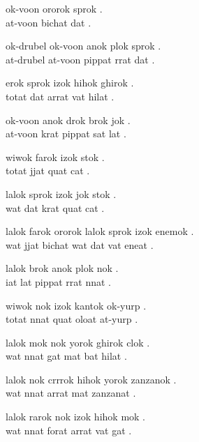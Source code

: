 \documentclass[a4paper, 11pt]{article}
\newlength{\lineseparation}
\begin{document}
\tt

 ok-voon ororok sprok . \\[\lineseparation]

 at-voon bichat dat .

\hrulefill

 ok-drubel ok-voon anok plok sprok . \\[\lineseparation]


 at-drubel at-voon pippat rrat dat . 

\hrulefill

 erok sprok izok hihok ghirok . \\[\lineseparation]


 totat dat arrat vat hilat . 

\hrulefill

 ok-voon anok drok brok jok . \\[\lineseparation]


 at-voon krat pippat sat lat . 

\hrulefill

 wiwok farok izok stok . \\[\lineseparation]


 totat jjat quat cat . 

\hrulefill

 lalok sprok izok jok stok . \\[\lineseparation]


 wat dat krat quat cat . 

\hrulefill

 lalok farok ororok lalok sprok izok enemok . \\[\lineseparation]


wat jjat bichat wat dat vat eneat . 

\newpage

 lalok brok anok plok nok . \\[\lineseparation]


 iat lat pippat rrat nnat . 

\hrulefill

 wiwok nok izok kantok ok-yurp . \\[\lineseparation]


 totat nnat quat oloat at-yurp . 

\hrulefill

 lalok mok nok yorok ghirok clok . \\[\lineseparation]


 wat nnat gat mat bat hilat . 

\hrulefill

 lalok nok crrrok hihok yorok zanzanok . \\[\lineseparation]


 wat nnat arrat mat zanzanat . 

\hrulefill

 lalok rarok nok izok hihok mok . \\[\lineseparation]


 wat nnat forat arrat vat gat . 
\end{document}
